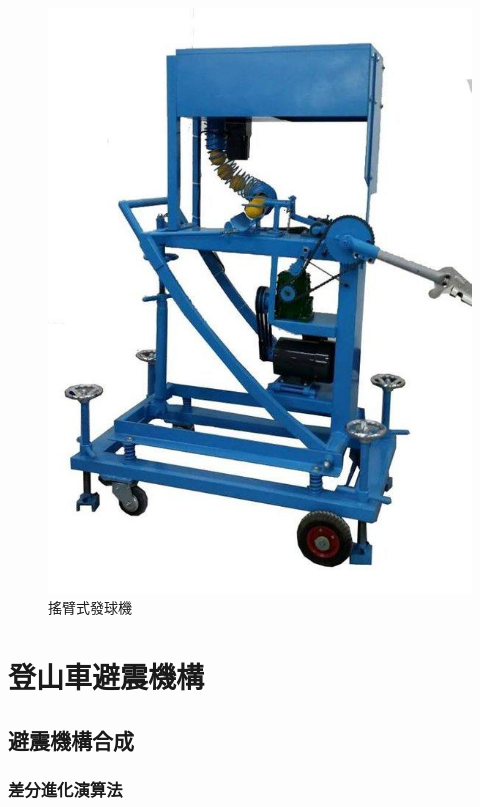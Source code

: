 \documentclass[14pt,a4paper]{report}  %
\begin{document}
{    \begin{figure}[H]
        \centering
        \includegraphics[scale=0.3]{搖臂式發球機.jpg} 
        \caption{搖臂式發球機} %
        \label{fig_Double Ball Lifter1:scale} %
    \end{figure}
    
        \chapter{登山車避震機構}
      \section{避震機構合成}
      \subsection{差分進化演算法}
 
}
\end{document}
